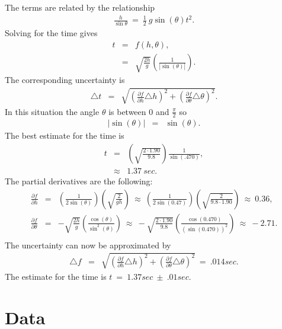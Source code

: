 \documentclass[12pt]{article}
\begin{document}
The terms are related by the relationship
\begin{eqnarray*}
\frac{h}{\sin\theta}~=~\frac{1}{2}~g\sin(\theta) t^2.
\end{eqnarray*}
Solving for the time gives
\begin{eqnarray*}
  t & = & f(h,\theta), \\
  & = & \sqrt{\frac{2h}{g}}\left(\frac{1}{|\sin(\theta)|}\right).
\end{eqnarray*}
The corresponding uncertainty is
\begin{eqnarray*}
  \triangle t & = & \sqrt{
    \left(\frac{\partial f}{\partial h} \triangle h \right)^2 +
    \left(\frac{\partial f}{\partial \theta} \triangle \theta \right)^2 }.
\end{eqnarray*}
In this situation the angle $\theta$ is between 0 and $\frac{\pi}{2}$
so  
\begin{eqnarray*}
  |\sin(\theta)| & = & \sin(\theta).
\end{eqnarray*}
The best estimate for the time is 
\begin{eqnarray*}
  t & = & \left(\sqrt{\frac{2\cdot 1.90}{9.8}}\right)
  \frac{1}{\sin(.470)}, \\
  & \approx & 1.37~sec.
\end{eqnarray*}
The partial derivatives are the following: 
\begin{eqnarray*}
\frac{\partial f}{\partial h} & = & 
\left(\frac{1}{2\sin(\theta)}\right)\left(\sqrt{\frac{2}{gh}}\right)
~ \approx ~ 
\left(\frac{1}{2\sin(0.47)}\right)\left(\sqrt{\frac{2}{9.8\cdot 1.90}}\right)
~ \approx ~ 0.36, \\
\frac{\partial f}{\partial \theta} & = &
-\sqrt{\frac{2h}{g}}\left(\frac{\cos(\theta)}{\sin^2(\theta)}\right)
~ \approx ~ 
-\sqrt{\frac{2\cdot 1.90}{9.8}}\left(\frac{\cos(0.470)}{(\sin(0.470))^2}\right)
~ \approx ~ -2.71.\\
\end{eqnarray*}
The uncertainty can now be approximated by
\begin{eqnarray*}
\triangle{f} & = & \sqrt{
  \left(\frac{\partial f}{\partial h} \triangle{h} \right)^2 +
  \left(\frac{\partial f}{\partial \theta} \triangle{\theta}\right)^2}
~=~.014sec.
\end{eqnarray*}
The estimate for the time is $t~=~1.37sec~\pm~.01sec$.

\fi

\section{Data}
\label{sect:data}
\end{document}
